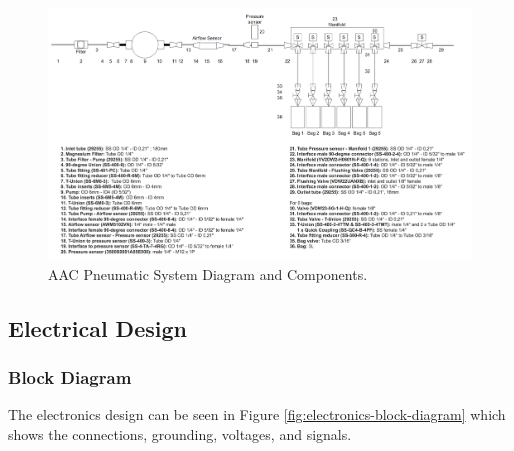 \documentclass[a4paper,12pt,oneside]{article}
\providecommand{\DIFdelend}{} %
\DeclareRobustCommand{\DIFdelend}{\DIFOaddend \let\includegraphics\DIFOincludegraphics} %
\begin{document}

\DIFdelend \begin{landscape}
\begin{figure}
    \centering
    \includegraphics[width=1.45\textwidth,height=\textheight]{4-experiment-design/img/Mechanical/AAC_System.png}
    \caption{AAC Pneumatic System Diagram and Components.}
    \label{pneumatic_system}
\end{figure}
\end{landscape}

\pagebreak
\subsection{Electrical Design}

\subsubsection{Block Diagram}
\label{sec:4.5.1}

The electronics design can be seen in Figure \ref{fig:electronics-block-diagram} which shows the connections, grounding, voltages, and signals. 
\end{document}
